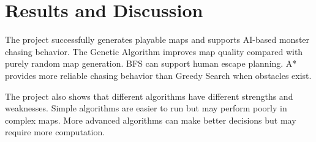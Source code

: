 \section{Results and Discussion}

The project successfully generates playable maps and supports AI-based monster chasing behavior. The Genetic Algorithm improves map quality compared with purely random map generation. BFS can support human escape planning. A* provides more reliable chasing behavior than Greedy Search when obstacles exist.

The project also shows that different algorithms have different strengths and weaknesses. Simple algorithms are easier to run but may perform poorly in complex maps. More advanced algorithms can make better decisions but may require more computation.

